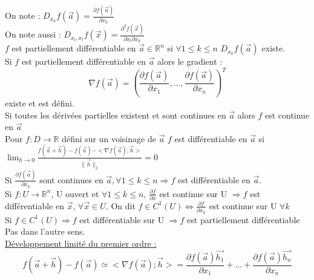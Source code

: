 \documentclass[../main.tex]{subfiles}
\begin{document}
On note : $D_{x_k} f(\vec{a}) = \frac{\partial f(\vec{a})}{\partial x_k}$\\
On note aussi : $D_{x_l,x_l} f(\vec{x}) = \frac{\partial^2 f(\vec{x})}{\partial x_l \partial x_k}$\\

$f$ est partiellement différentiable en $\vec{a} \in \mathbb{R}^n$ si $\forall 1\leq k\leq n$ $D_{x_k} f(\vec{a})$ existe.\\

Si $f$ est partiellement différentiable en $\vec{a}$ alors le gradient :\\
\begin{equation}
    \nabla f(\vec{a}) = (\frac{\partial f(\vec{a})}{\partial x_1}, \dots, \frac{\partial f(\vec{a})}{\partial x_n})^T
\end{equation}
existe et est défini.\\

Si toutes les dérivées partielles existent et sont continues en $\vec{a}$ alors $f$ est continue en $\vec{a}$\\

Pour $f:D\rightarrow \mathbb{R}$ défini sur un voisinage de $\vec{a}$ $f$ est différentiable en $\vec{a}$ si \\
$\lim_{h\rightarrow 0} \frac{f(\vec{a}+\vec{h})-f(\vec{a})-<\nabla f(\vec{a}); \vec{h}>}{\parallel \vec{h}\parallel_2} = 0$\\

Si $\frac{\partial f(\vec{a})}{\partial x_k}$ sont continues en $\vec{a}, \forall 1\leq k \leq n \Rightarrow f$ est différentiable en $\vec{a}$.\\

Si $f: U\rightarrow \mathbb{R}^n$, U ouvert et $\forall 1\leq k \leq n$, $\frac{\partial f}{\partial x}$ est continue sur U $\Rightarrow f$ est différentiable en $\vec{x}$, $\forall \vec{x} \in U$. On dit $f \in C^1(U) \Leftrightarrow \frac{\partial f}{\partial x_k}$ est continue sur U $\forall k$\\
Si $f \in C^1(U) \Rightarrow f$ est différentiable sur U $\Rightarrow f$ est partiellement différentiable\\
\warning Pas dans l'autre sens.\\

\quad \underline{Développement limité du premier ordre :}\\
\begin{equation}
    f(\vec{a}+\vec{h})-f(\vec{a}) \simeq <\nabla f(\vec{a}); \vec{h}> = \frac{\partial f(\vec{a}) \vec{h_1}}{\partial x_1} + \dots + \frac{\partial f(\vec{a}) \vec{h_n}}{\partial x_n}
\end{equation}
\end{document}
